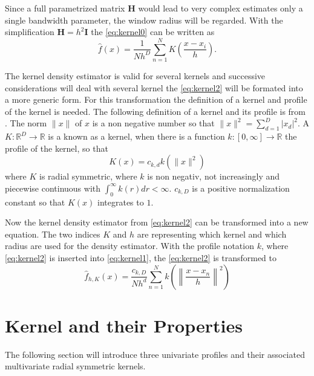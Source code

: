 Since a full parametrized matrix $\mathbf{H}$ would lead to very complex estimates
only a single bandwidth parameter, the window radius will be regarded. With the
simplification $\mathbf{H} = h^2 \mathbf{I}$ the \autoref{eq:kernel0} can be 
written as
\begin{equation}\label{eq:kernel2}
	\hat{f}(x) = \frac{1}{Nh^D}\sum_{n=1}^N K\left( \frac{x - x_i}{h} \right).
\end{equation}

The kernel density estimator is valid for several kernels and successive
considerations will deal with several kernel the \autoref{eq:kernel2} will be
formated into a more generic form. For this transformation the definition of a
kernel and profile of the kernel is needed. The following definition of a kernel
and its profile is from \citeauthor{citeulike:2522867}
\citep{citeulike:2522867}. The norm $\lVert x \rVert$ of $x$ is a non negative number 
so that $\lVert x \rVert^2 = \sum_{d = 1}^D|x_d|^2$.
A $K:\mathbb{R}^D \rightarrow \mathbb{R}$ is
a known as a kernel, when there is a function $k:[0, \infty] \rightarrow
\mathbb{R}$ the profile of the kernel, so that
\begin{equation}\label{eq:kernel3}
	K(x)=c_{k,d}k(\lVert x \rVert^2)
\end{equation}
where $K$ is radial symmetric, where $k$ is non negativ, not increasingly and
piecewise continuous with $\int_0^{\infty} k(r) dr < \infty$. $c_{k,D}$ is a
positive normalization constant so that $K(x)$ integrates to $1$.

Now the kernel density estimator from \autoref{eq:kernel2} can be transformed
into a new equation. The two indices $K$ and $h$ are representing which kernel
and which radius are used for the density estimator. With the profile notation
$k$, where \autoref{eq:kernel2} is inserted into \autoref{eq:kernel1}, the
\autoref{eq:kernel2} is transformed to
\begin{equation}\label{eq:kernel4}
	\hat{f}_{h,K}(x) = \frac{c_{k,D}}{Nh^d}
	\sum_{n = 1}^N k\left(\left\lVert \frac{x-x_n}{h} \right\rVert^2\right)
\end{equation}



\section{Kernel and their Properties} %
\label{sec:kernel_properties}
The following section will introduce three univariate profiles and their associated
multivariate radial symmetric kernels. 

